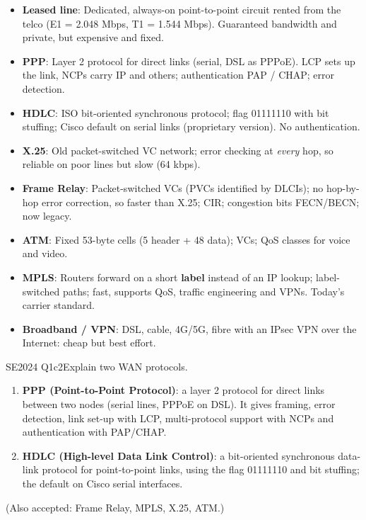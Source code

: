 \documentclass[10pt]{article}
\begin{document}
\begin{itemize}
\item \textbf{Leased line}: Dedicated, always-on point-to-point circuit rented from the telco (E1 = 2.048 Mbps, T1 = 1.544 Mbps). Guaranteed bandwidth and private, but expensive and fixed.
\item \textbf{PPP}: Layer 2 protocol for direct links (serial, DSL as PPPoE). LCP sets up the link, NCPs carry IP and others; authentication PAP / CHAP; error detection.
\item \textbf{HDLC}: ISO bit-oriented synchronous protocol; flag 01111110 with bit stuffing; Cisco default on serial links (proprietary version). No authentication.
\item \textbf{X.25}: Old packet-switched VC network; error checking at \emph{every} hop, so reliable on poor lines but slow (64 kbps).
\item \textbf{Frame Relay}: Packet-switched VCs (PVCs identified by DLCIs); no hop-by-hop error correction, so faster than X.25; CIR; congestion bits FECN/BECN; now legacy.
\item \textbf{ATM}: Fixed 53-byte cells (5 header + 48 data); VCs; QoS classes for voice and video.
\item \textbf{MPLS}: Routers forward on a short \textbf{label} instead of an IP lookup; label-switched paths; fast, supports QoS, traffic engineering and VPNs. Today's carrier standard.
\item \textbf{Broadband / VPN}: DSL, cable, 4G/5G, fibre with an IPsec VPN over the Internet: cheap but best effort.
\end{itemize}

\begin{pastq}{SE2024 Q1c}{2}Explain two WAN protocols.\end{pastq}
\begin{ans}
\begin{enumerate}
\item \textbf{PPP (Point-to-Point Protocol)}: a layer 2 protocol for direct links between two nodes (serial lines, PPPoE on DSL). It gives framing, error detection, link set-up with LCP, multi-protocol support with NCPs and authentication with PAP/CHAP.
\item \textbf{HDLC (High-level Data Link Control)}: a bit-oriented synchronous data-link protocol for point-to-point links, using the flag 01111110 and bit stuffing; the default on Cisco serial interfaces.
\end{enumerate}
(Also accepted: Frame Relay, MPLS, X.25, ATM.)
\end{ans}
\end{document}
